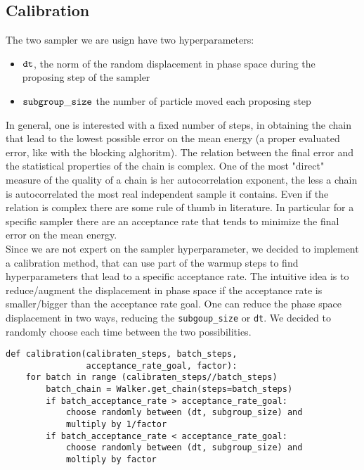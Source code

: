 \documentclass{article}
\begin{document}
\subsection{Calibration}
The two sampler we are usign have two hyperparameters:
\begin{itemize}
    \item ${\tt dt}$, the norm of the random displacement in phase space during the proposing step of the sampler
    \item ${\tt subgroup\_size}$ the number of particle moved each proposing step
\end{itemize}
In general, one is interested with a fixed number of steps, in obtaining the chain that lead to the lowest possible error on the mean energy (a proper evaluated error, like with the blocking alghoritm). The relation between the final error and the statistical properties of the chain is complex\cite{Pederiva}. One of the most "direct" measure of the quality of a chain is her autocorrelation exponent, the less a chain is autocorrelated the most real independent sample it contains. Even if the relation is complex there are some rule of thumb in literature. In particular for a specific sampler there are an acceptance rate that tends to minimize the final error on the mean energy.\\ 

Since we are not expert on the sampler hyperparameter, we decided to implement a calibration method, that can use part of the warmup steps to find hyperparameters that lead to a specific acceptance rate. The intuitive idea is to reduce/augment the displacement in phase space if the acceptance rate is smaller/bigger than the acceptance rate goal. One can reduce the phase space displacement in two ways, reducing the \texttt{subgoup\_size} or \texttt{dt}. We decided to randomly choose each time between the two possibilities.

\begin{lstlisting}
def calibration(calibraten_steps, batch_steps, 
                acceptance_rate_goal, factor):
    for batch in range (calibraten_steps//batch_steps)
        batch_chain = Walker.get_chain(steps=batch_steps)
        if batch_acceptance_rate > acceptance_rate_goal:
            choose randomly between (dt, subgroup_size) and
            multiply by 1/factor
        if batch_acceptance_rate < acceptance_rate_goal:
            choose randomly between (dt, subgroup_size) and 
            moltiply by factor
\end{lstlisting}
\end{document}
